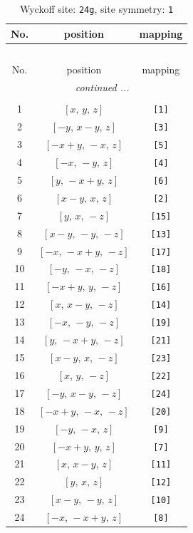 \documentclass[fleqn,8pt]{jsarticle}
\begin{document}
\begin{longtable}{ccc}
\caption{Wyckoff site: {\tt 24g}, site symmetry: {\tt 1}}
 \\
 \hline \hline
No. & position & mapping \\ \hline \endfirsthead

\multicolumn{2}{l}{\tablename\ \thetable{}} \\
 \hline \hline
No. & position & mapping \\ \hline \endhead

 \hline \hline
\multicolumn{2}{r}{\footnotesize\it continued ...} \\ \endfoot

 \hline \hline
\multicolumn{2}{r}{} \\ \endlastfoot

1 & $\left[ x,\, y,\, z \right]$ & {\tt [1]} \\ \hline
2 & $\left[ - y,\, x - y,\, z \right]$ & {\tt [3]} \\ \hline
3 & $\left[ - x + y,\, - x,\, z \right]$ & {\tt [5]} \\ \hline
4 & $\left[ - x,\, - y,\, z \right]$ & {\tt [4]} \\ \hline
5 & $\left[ y,\, - x + y,\, z \right]$ & {\tt [6]} \\ \hline
6 & $\left[ x - y,\, x,\, z \right]$ & {\tt [2]} \\ \hline
7 & $\left[ y,\, x,\, - z \right]$ & {\tt [15]} \\ \hline
8 & $\left[ x - y,\, - y,\, - z \right]$ & {\tt [13]} \\ \hline
9 & $\left[ - x,\, - x + y,\, - z \right]$ & {\tt [17]} \\ \hline
10 & $\left[ - y,\, - x,\, - z \right]$ & {\tt [18]} \\ \hline
11 & $\left[ - x + y,\, y,\, - z \right]$ & {\tt [16]} \\ \hline
12 & $\left[ x,\, x - y,\, - z \right]$ & {\tt [14]} \\ \hline
13 & $\left[ - x,\, - y,\, - z \right]$ & {\tt [19]} \\ \hline
14 & $\left[ y,\, - x + y,\, - z \right]$ & {\tt [21]} \\ \hline
15 & $\left[ x - y,\, x,\, - z \right]$ & {\tt [23]} \\ \hline
16 & $\left[ x,\, y,\, - z \right]$ & {\tt [22]} \\ \hline
17 & $\left[ - y,\, x - y,\, - z \right]$ & {\tt [24]} \\ \hline
18 & $\left[ - x + y,\, - x,\, - z \right]$ & {\tt [20]} \\ \hline
19 & $\left[ - y,\, - x,\, z \right]$ & {\tt [9]} \\ \hline
20 & $\left[ - x + y,\, y,\, z \right]$ & {\tt [7]} \\ \hline
21 & $\left[ x,\, x - y,\, z \right]$ & {\tt [11]} \\ \hline
22 & $\left[ y,\, x,\, z \right]$ & {\tt [12]} \\ \hline
23 & $\left[ x - y,\, - y,\, z \right]$ & {\tt [10]} \\ \hline
24 & $\left[ - x,\, - x + y,\, z \right]$ & {\tt [8]} \\
\end{longtable}
\end{document}
